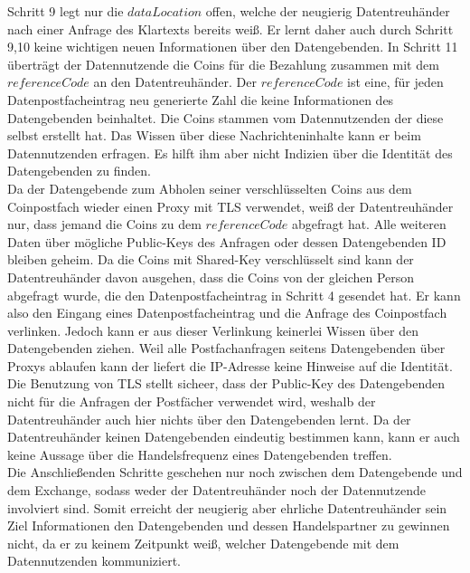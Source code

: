 \documentclass[
	fontsize=12pt,
	headings=small,
	parskip=half,           %
	bibliography=totoc,
	numbers=noenddot,       %
	open=any,               %
]{scrreprt}
\begin{document}
Schritt 9 legt nur die $dataLocation$ offen, welche der neugierig Datentreuhänder nach einer Anfrage des Klartexts bereits weiß. Er lernt daher auch durch Schritt 9,10 keine wichtigen neuen Informationen über den Datengebenden. In Schritt 11 überträgt der Datennutzende die Coins für die Bezahlung zusammen mit dem $referenceCode$ an den Datentreuhänder. Der $referenceCode$ ist eine, für jeden Datenpostfacheintrag neu generierte Zahl die keine Informationen des Datengebenden beinhaltet. Die Coins stammen vom Datennutzenden der diese selbst erstellt hat. Das Wissen über diese Nachrichteninhalte kann er beim Datennutzenden erfragen. Es hilft ihm aber nicht Indizien über die Identität des Datengebenden zu finden.\\

Da der Datengebende zum Abholen seiner verschlüsselten Coins aus dem Coinpostfach wieder einen Proxy mit TLS verwendet, weiß der Datentreuhänder nur, dass jemand die Coins zu dem $referenceCode$ abgefragt hat. Alle weiteren Daten über mögliche Public-Keys des Anfragen oder dessen Datengebenden ID bleiben geheim. Da die Coins mit Shared-Key verschlüsselt sind kann der Datentreuhänder davon ausgehen, dass die Coins von der gleichen Person abgefragt wurde, die den Datenpostfacheintrag in Schritt 4 gesendet hat. Er kann also den Eingang eines Datenpostfacheintrag und die Anfrage des Coinpostfach verlinken. Jedoch kann er aus dieser Verlinkung keinerlei Wissen über den Datengebenden ziehen. Weil alle Postfachanfragen seitens Datengebenden über Proxys ablaufen kann der liefert die IP-Adresse keine Hinweise auf die Identität. Die Benutzung von TLS stellt sicheer, dass der Public-Key des Datengebenden nicht für die Anfragen der Postfächer verwendet wird, weshalb der Datentreuhänder auch hier nichts über den Datengebenden lernt. Da der Datentreuhänder keinen Datengebenden eindeutig bestimmen kann, kann er auch keine Aussage über die Handelsfrequenz eines Datengebenden treffen.\\

Die Anschließenden Schritte geschehen nur noch zwischen dem Datengebende und dem Exchange, sodass weder der Datentreuhänder noch der Datennutzende involviert sind. Somit erreicht der neugierig aber ehrliche Datentreuhänder sein Ziel Informationen den Datengebenden und dessen Handelspartner zu gewinnen nicht, da er zu keinem Zeitpunkt weiß, welcher Datengebende mit dem Datennutzenden kommuniziert.
\end{document}
